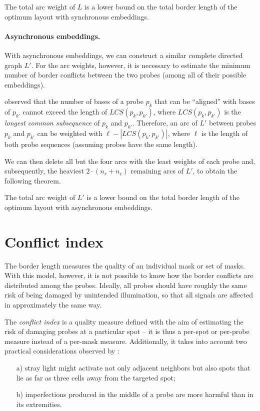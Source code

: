 \begin{theorem}
  \label{thm:sync_lb}
  The total arc weight of $L$ is a lower bound on the total border length of
  the optimum layout with synchronous embeddings.
\end{theorem}

\paragraph{Asynchronous embeddings.}
With asynchronous embeddings, we can construct a similar complete directed graph
$L'$. For the arc weights, however, it is necessary to estimate the minimum
number of border conflicts between the two probes (among all of their possible
embeddings).

\citet{Kahng2002} observed that the number of bases of a probe $p_k$ that can
be ``aligned'' with bases of $p_{k'}$ cannot exceed the length of $LCS(p_k,p_{k'})$,
where $LCS(p_k,p_{k'})$ is the
\emph{longest common subsequence} of $p_k$ and $p_{k'}$. Therefore, an arc of $L'$
between probes $p_k$ and $p_{k'}$ can be weighted with $\ell - |LCS(p_k,p_{k'})|$,
where $\ell$ is the length of both probe sequences (assuming probes have the same length).

We can then delete all but the four arcs with the least weights of each probe
and, subsequently, the heaviest $2 \cdot (n_r + n_c)$ remaining arcs of $L'$, to
obtain the following theorem.

\begin{theorem}
  \label{thm:async_lb}
  The total arc weight of $L'$ is a lower bound on the total border length of
  the optimum layout with asynchronous embeddings.
\end{theorem}

\section{Conflict index}
\label{sec:mlp_conflict_index}

The border length measures the quality of an individual mask or set of masks.
With this model, however, it is not possible to know how the border conflicts
are distributed among the probes. Ideally, all probes should have roughly the
same risk of being damaged by unintended illumination, so that all signals are
affected in approximately the same way.

The \emph{conflict index} is a quality measure defined with the aim of
estimating the risk of damaging probes at a particular spot
\citep{Carvalho2006a} -- it is thus a per-spot or per-probe measure instead of a
per-mask measure.  Additionally, it takes into account two practical
considerations observed by \citet{Kahng2003}:
\begin{itemize}
\item[a)] stray light might activate not only adjacent neighbors but also spots
  that lie as far as three cells away from the targeted spot;
\item[b)] imperfections produced in the middle of a probe are more harmful than
  in its extremities.
\end{itemize}

